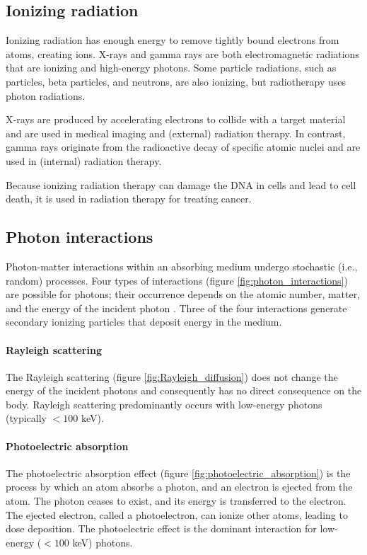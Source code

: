 \subsection{Ionizing radiation}
Ionizing radiation has enough energy to remove tightly bound electrons from atoms, creating ions.
X-rays and gamma rays are both electromagnetic radiations that are ionizing and high-energy photons.
Some particle radiations, such as particles, beta particles, and neutrons, are also ionizing, but radiotherapy uses photon radiations.

X-rays are produced by accelerating electrons to collide with a target material and are used in medical imaging and (external) radiation therapy.
In contrast, gamma rays originate from the radioactive decay of specific atomic nuclei and are used in (internal) radiation therapy. 

Because ionizing radiation therapy can damage the DNA in cells and lead to cell death, it is used in radiation therapy for treating cancer.

\subsection{Photon interactions}
Photon-matter interactions within an absorbing medium undergo stochastic (i.e., random) processes.
Four types of interactions (figure \ref{fig:photon_interactions}) are possible for photons; their occurrence depends on the atomic number, matter, and the energy of the incident photon \cite{Evans1958}.
Three of the four interactions generate secondary ionizing particles that deposit energy in the medium.

\paragraph{Rayleigh scattering}
The Rayleigh scattering (figure \ref{fig:Rayleigh_diffusion}) does not change the energy of the incident photons and consequently has no direct consequence on the body.
Rayleigh scattering predominantly occurs with low-energy photons (typically $ < 100$ keV).

\paragraph{Photoelectric absorption}
The photoelectric absorption effect (figure \ref{fig:photoelectric_absorption}) is the process by which an atom absorbs a photon, and an electron is ejected from the atom.
The photon ceases to exist, and its energy is transferred to the electron.
The ejected electron, called a photoelectron, can ionize other atoms, leading to dose deposition.
The photoelectric effect is the dominant interaction for low-energy ($ < 100$ keV) photons.

